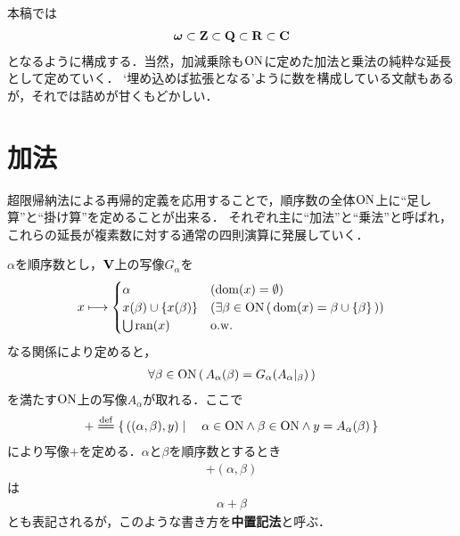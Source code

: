 本稿では
\begin{align}
	{\boldsymbol \omega} \subset \mathbf{Z} \subset \mathbf{Q} \subset \mathbf{R} \subset \mathbf{C}
\end{align}
となるように構成する．当然，加減乗除も$\mathrm{ON}$に定めた加法と乗法の純粋な延長として定めていく．
`埋め込めば拡張となる'ように数を構成している文献もあるが，それでは詰めが甘くもどかしい．

\section{加法}
	超限帰納法による再帰的定義を応用することで，順序数の全体$\mathrm{ON}$上に``足し算''と``掛け算''を定めることが出来る．
	それぞれ主に``加法''と``乗法''と呼ばれ，これらの延長が複素数に対する通常の四則演算に発展していく．
	
	\begin{screen}
		\begin{dfn}[順序数の加法]
			$\alpha$を順序数とし，$\mathbf{V}$上の写像$G_\alpha$を
			\begin{align}
				x \longmapsto 
				\begin{cases}
					\alpha & (\operatorname{dom}(x) = \emptyset) \\
					x(\beta) \cup \{x(\beta)\} & (
					\exists \beta \in \mathrm{ON}\, (\, \operatorname{dom}(x) = \beta \cup \{\beta\}\, )) \\
					\bigcup \operatorname{ran}(x) & \mathrm{o.w.}
				\end{cases}
			\end{align}
			なる関係により定めると，
			\begin{align}
				\forall \beta \in \mathrm{ON}\, (\, A_\alpha(\beta) = G_\alpha(A_\alpha|_\beta)\, )
			\end{align}
			を満たす$\mathrm{ON}$上の写像$A_\alpha$が取れる．ここで
			\begin{align}
				+ \defeq \Set{((\alpha,\beta),y)}{\alpha \in \ON \wedge \beta \in \ON \wedge y = A_\alpha (\beta)}
			\end{align}
			により写像$+$を定める．$\alpha$と$\beta$を順序数とするとき
			\begin{align}
				+(\alpha,\beta)
			\end{align}
			は
			\begin{align}
				\alpha + \beta
			\end{align}
			とも表記されるが，このような書き方を{\bf 中置記法}と呼ぶ．
		\end{dfn}
	\end{screen}
	
